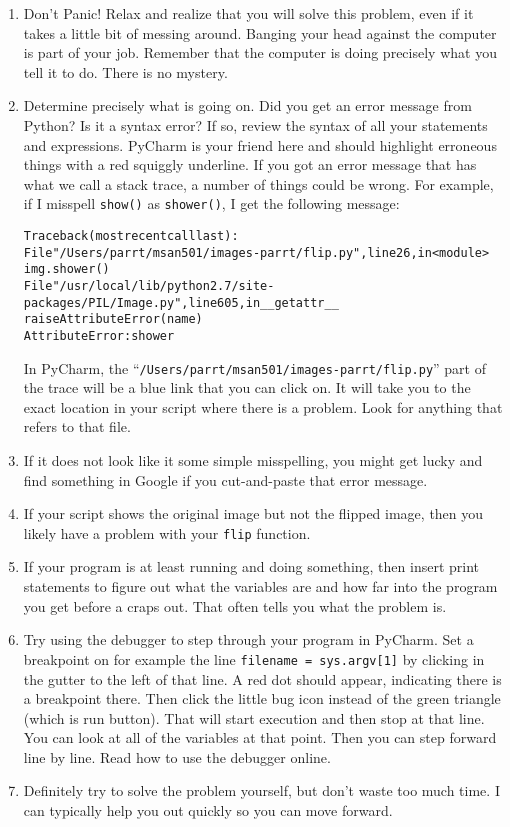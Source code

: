 \documentclass[titlepage]{tufte-book}
\newcounter{problem}
\begin{document}
\begin{enumerate}
\item Don't Panic! Relax and realize that you will solve this problem, even if it takes a little bit of messing around. Banging your head against the computer is part of your job. Remember that the computer is doing precisely what you tell it to do. There is no mystery.
\item  Determine precisely what is going on. Did you get an error message from Python?  Is it a syntax error? If so, review the syntax of all your statements and expressions. PyCharm is your friend here and should highlight erroneous things with a red squiggly underline. If you got an error message that has what we call a stack trace, a number of things could be wrong. For example, if I misspell {\tt show()} as {\tt shower()}, I get the following message:
\begin{alltt}\small
Traceback (most recent call last):
  File "/Users/parrt/msan501/images-parrt/flip.py", line 26, in <module>
    img.shower()
  File "/usr/local/lib/python2.7/site-packages/PIL/Image.py", line 605, in __getattr__
    raise AttributeError(name)
AttributeError: shower
\end{alltt}
In PyCharm, the ``{\tt /Users/parrt/msan501/images-parrt/flip.py}'' part of the trace will be a blue link that you can click on. It will take you to the exact location in your script where there is a problem. Look for anything that refers to that file.
\item If it does not look like it some simple misspelling, you might get lucky and find something in Google if you cut-and-paste that error message.
\item If your script shows the original image but not the flipped image, then you likely have a problem with your {\tt flip} function.
\item If your program is at least running and doing something, then insert print statements to figure out what the variables are and how far into the program you get before a craps out. That often tells you what the problem is.
\item Try using the debugger to step through your program in PyCharm. Set a breakpoint on for example the line {\tt filename = sys.argv[1]} by clicking in the gutter to the left of that line.  A red dot should appear, indicating there is a breakpoint there. Then click the little bug icon instead of the green triangle (which is run button). That will start execution and then stop at that line. You can look at all of the variables at that point. Then you can step forward line by line. Read how to use the debugger online.
\item  Definitely try to solve the problem yourself, but don't waste too much time. I can typically help you out quickly so you can move forward.
\end{enumerate}
\end{document}

